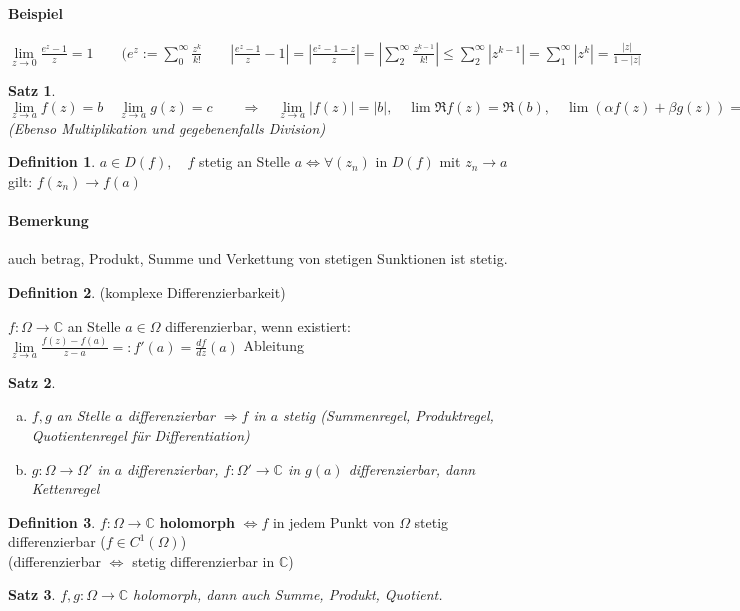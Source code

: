 \documentclass[ngerman,halfparskip]{scrartcl}
\newtheorem{satz}{Satz}[section]
\theoremstyle{definition}
\newtheorem{defin}{Definition}[section]
\def\C{\mathbb C}
\begin{document}
\paragraph*{Beispiel} $\lim\limits_{ z\rightarrow 0} \frac{e^z-1}{z}=1 \qquad (e^z:=\sum\limits_0^\infty \frac {z^k}{k!}\qquad |\frac{e^z-1}{z}-1|=|\frac{e^z-1-z}{z}|=|\sum\limits_2^\infty \frac {z^{k-1}}{k!}|\leq \sum\limits_2^\infty |z^{k-1}|=\sum\limits_1^\infty |z^k|=\frac{|z|}{1-|z|}$

\begin{satz}
$\lim\limits_{ z\rightarrow a} f(z)=b\quad \lim\limits_{ z\rightarrow a} g(z)=c \qquad\Rightarrow \quad\lim\limits_{ z\rightarrow a} |f(z)|=|b|,  \quad \lim \Re f(z)=\Re (b),\quad \lim(\alpha f(z)+\beta g(z))=\alpha b+\beta c$ (Ebenso Multiplikation und gegebenenfalls Division)
\end{satz}

\begin{defin}
$a\in D(f), \quad f$ stetig an Stelle $a \Leftrightarrow \forall (z_n)$ in $D(f)$ mit $z_n\to a$ gilt: $f(z_n)\to f(a)$
\end{defin}
\paragraph{Bemerkung} auch betrag, Produkt, Summe und Verkettung von stetigen Sunktionen ist stetig.

\begin{defin}(komplexe Differenzierbarkeit) 

$f: \Omega \to \C$ an Stelle $a\in\Omega$ differenzierbar, wenn existiert: $\lim\limits_{z\to a} \frac{f(z)-f(a)}{z-a}=:f'(a)= \frac {df}{dz}(a)$ Ableitung

\end{defin}
\begin{satz}
\begin{enumerate}[a)]
\item $f,g$ an Stelle $a$ differenzierbar $\Rightarrow f$ in $a$ stetig (Summenregel, Produktregel, Quotientenregel für Differentiation)
\item $g: \Omega \to \Omega'$ in $a$ differenzierbar, $f:\Omega'\to\C$ in $g(a)$ differenzierbar, dann Kettenregel
\end{enumerate}
\end{satz}

\begin{defin}
$f:\Omega \to \C$ \textbf{holomorph} $\Leftrightarrow f$ in jedem Punkt von $\Omega$ stetig differenzierbar ($f\in C^1(\Omega)$)\\(differenzierbar $\Leftrightarrow$ stetig differenzierbar in $\C$)
\end{defin}
\begin{satz}
$f,g: \Omega \to \C$ holomorph, dann auch Summe, Produkt, Quotient.
\end{satz}
\end{document}
